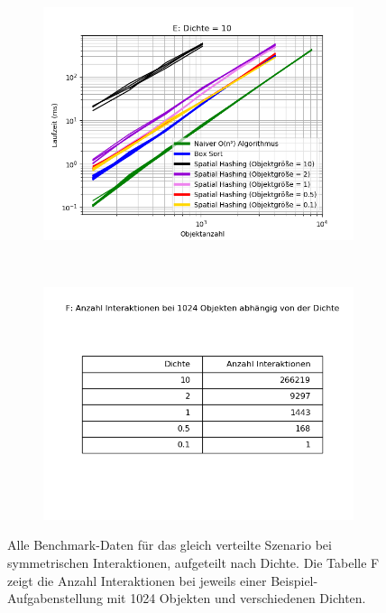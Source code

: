 \begin{figure}
\begin{subfigure}[t]{0.55\textwidth}
		\label{fig:symmetricComparison-D}
	\end{subfigure}
~
	\begin{subfigure}[t]{0.55\textwidth}
		\centering
		\includegraphics[width=1\textwidth]{./res/symmetricComparison-E.png}

		\label{fig:symmetricComparison-E}
	\end{subfigure}
~
	\begin{subfigure}[t]{0.55\textwidth}
		\centering
		\includegraphics[width=1\textwidth]{./res/symmetricComparison-F.png}

		\label{fig:symmetricComparison-F}
	\end{subfigure}

	\caption{Alle Benchmark-Daten für das gleich verteilte Szenario bei symmetrischen Interaktionen, aufgeteilt nach Dichte. Die Tabelle F zeigt die Anzahl Interaktionen bei jeweils einer Beispiel-Aufgabenstellung mit 1024 Objekten und verschiedenen Dichten.}
	\label{fig:symmetricComparison}
\end{figure}

